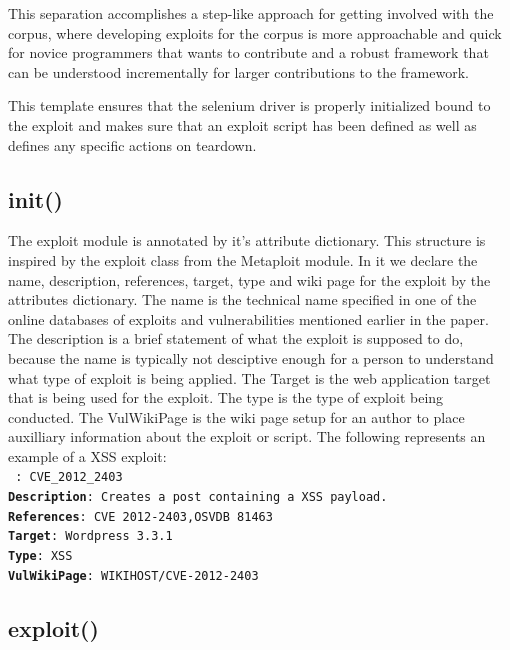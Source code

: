 \documentclass[letterpaper,twocolumn,10pt]{article}
\begin{document}
This separation accomplishes a step-like approach for getting involved with the corpus, where developing exploits for the corpus is more approachable and quick for novice programmers that wants to contribute and a robust framework that can be understood incrementally for larger contributions to the framework.\par
 
This template ensures that the selenium driver is properly initialized bound to the exploit and makes sure that an exploit script has been defined as well as defines any specific actions on teardown.\par


\subsection{init()}

The exploit module is annotated by it's attribute dictionary. This structure is inspired by the exploit class from the Metaploit module. In it we declare the name, description, references, target, type and wiki page for the exploit by the attributes dictionary.  The name is the technical name specified in one of the online databases of exploits and vulnerabilities mentioned earlier in the paper.  The description is a brief statement of what the exploit is supposed to do, because the name is typically not desciptive enough for a person to understand what type of exploit is being applied.  The Target is the web application target that is being used for the exploit.  The type is the type of exploit being conducted.  The VulWikiPage is the wiki page setup for an author to place auxilliary information about the exploit or script.  The following represents an example of a XSS exploit:\\

{\tt \small
{}:	CVE\_2012\_2403\\
{\bf Description}:		Creates a post containing a XSS payload.\\
{\bf References}:	CVE 2012-2403,OSVDB 81463 \\
{\bf Target}: 		Wordpress 3.3.1\\
{\bf Type}: 		XSS\\
{\bf VulWikiPage}: WIKIHOST/CVE-2012-2403
}

\subsection{exploit()}
\end{document}
